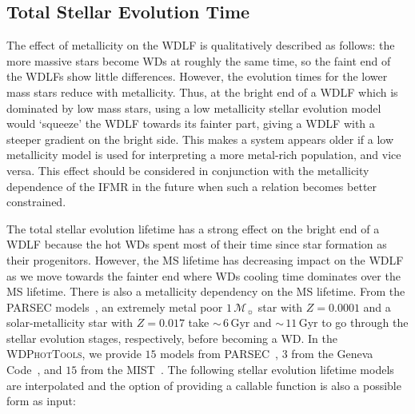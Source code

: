 \documentclass[fleqn,usenatbib]{rasti}
\newcommand{\msun}{\mathcal{M}_{\sun}}
\begin{document}
\subsection{Total Stellar Evolution Time}
\label{sec:evolution_time}
The effect of metallicity on the WDLF is qualitatively
described as follows: the more massive stars become WDs at roughly the same
time, so the faint end of the WDLFs show little differences. However, the
evolution times for the lower mass stars reduce with metallicity. Thus, at the
bright end of a WDLF which is dominated by low mass stars, using a low
metallicity stellar evolution model would `squeeze' the WDLF towards its
fainter part, giving a WDLF with a steeper gradient on the bright side.
This makes a system appears older if a low metallicity model is used for
interpreting a more metal-rich population, and vice versa. This effect should
be considered in conjunction with the metallicity dependence of the IFMR in
the future when such a relation becomes better constrained.

The total stellar evolution lifetime has a strong effect on the bright end of a
WDLF because the hot WDs spent most of their time since star formation as their
progenitors. However, the MS lifetime has decreasing impact on the WDLF as we
move towards the fainter end where WDs cooling time dominates over the MS
lifetime. There is also a metallicity dependency on the MS lifetime. From the
PARSEC models~\citep{2013EPJWC..4303001B}, an extremely metal poor $1\,\msun$ star
with  $Z=0.0001$ and a solar-metallicity star with $Z=0.017$ take $\sim$\,$6$\,Gyr
and $\sim$\,$11$\,Gyr to go through the stellar evolution stages, respectively,
before becoming a WD. In the \textsc{WDPhotTools}, we provide $15$ models from
PARSEC~\citep{2012MNRAS.427..127B, 2013EPJWC..4303001B, 2014MNRAS.444.2525C},
$3$ from the Geneva Code~\citep{2012A&A...537A.146E, 2012A&A...541A..41M,
2013A&A...553A..24G, 2013A&A...558A.103G}, and $15$ from the
MIST~\citep{2011ApJS..192....3P, 2013ApJS..208....4P, 2015ApJS..220...15P,
2016ApJS..222....8D, 2016ApJ...823..102C}. The following stellar evolution
lifetime models are interpolated and the option of providing a callable
function is also a possible form as input:
\end{document}
